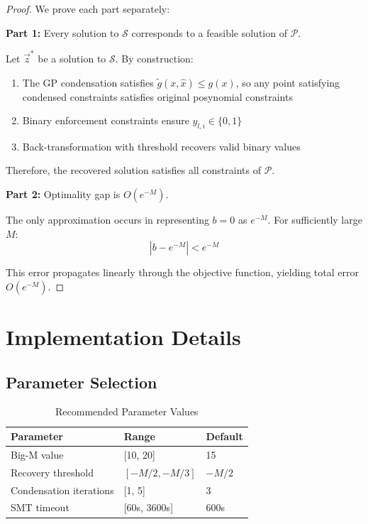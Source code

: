 \documentclass[11pt]{article}
\begin{document}
\begin{proof}
We prove each part separately:

\textbf{Part 1:} Every solution to $\mathcal{S}$ corresponds to a feasible solution of $\mathcal{P}$.

Let $\vec{z}^*$ be a solution to $\mathcal{S}$. By construction:
\begin{enumerate}
    \item The GP condensation satisfies $\tilde{g}(x,\hat{x}) \leq g(x)$, so any point satisfying condensed constraints satisfies original posynomial constraints
    \item Binary enforcement constraints ensure $y_{l,i} \in \{0,1\}$
    \item Back-transformation with threshold recovers valid binary values
\end{enumerate}

Therefore, the recovered solution satisfies all constraints of $\mathcal{P}$.

\textbf{Part 2:} Optimality gap is $O(e^{-M})$.

The only approximation occurs in representing $b=0$ as $e^{-M}$. For sufficiently large $M$:
\begin{equation}
    |b - e^{-M}| < e^{-M}
\end{equation}

This error propagates linearly through the objective function, yielding total error $O(e^{-M})$.
\end{proof}

\section{Implementation Details}

\subsection{Parameter Selection}

\begin{table}[h]
\centering
\caption{Recommended Parameter Values}
\begin{tabular}{|l|l|l|}
\hline
Parameter & Range & Default \\
\hline
Big-M value & [10, 20] & 15 \\
Recovery threshold & $[-M/2, -M/3]$ & $-M/2$ \\
Condensation iterations & [1, 5] & 3 \\
SMT timeout & [60s, 3600s] & 600s \\
\hline
\end{tabular}
\end{table}
\end{document}
